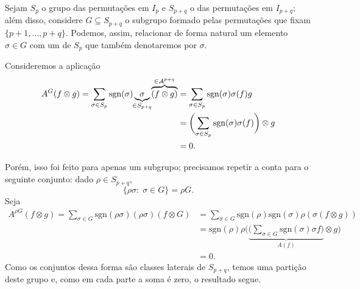 \documentclass[../differential_forms.tex]{subfiles}
\begin{document}
\begin{proof*}
	Sejam \(S_{p}\) o grupo das permutações em \(I_{p}\) e \(S_{p+q}\) o das permutações em \(I_{p+q}\); além disso, considere \(G\subseteq S_{p+q}\) o subgrupo formado
	pelas permutações que fixam \(\{p+1, \dotsc , p+q\}\). Podemos, assim, relacionar de forma natural um elemento \(\sigma \in G\) com um de \(S_{p}\) que também denotaremos
	por \(\sigma\).

	Consideremos a aplicação
	\begin{align*}
		A^{G}(f \otimes g) = \sum\limits_{\sigma \in S_{p}}^{}\mathrm{sgn}(\sigma) \underbrace{\sigma}_{\mathclap{\in S_{p+q}}} \overbrace{(f\otimes g)}^{\in \mathcal{A}^{p+q}} & = \sum\limits_{\sigma \in S_{p}}^{}\mathrm{sgn}(\sigma) \sigma (f)g                       \\
		                                                                                                                                                                         & = \biggl(\sum\limits_{\sigma \in S_{p}}^{}\mathrm{sgn}(\sigma) \sigma (f)\biggr)\otimes g \\
		                                                                                                                                                                         & = 0.
	\end{align*}

	Porém, isso foi feito para apenas um subgrupo; precisamos repetir a conta para o seguinte conjunto: dado \(\rho \in S_{p+q}\),
	\[
		\{\rho \sigma :\; \sigma \in G\} = \rho G.
	\]
	Seja
	\begin{align*}
		A^{\rho G}(f\otimes g) = \sum\limits_{\sigma \in G}^{}\mathrm{sgn}(\rho \sigma )(\rho \sigma )(f\otimes G) & = \sum\limits_{\sigma \in G}^{}\mathrm{sgn}(\rho) \mathrm{sgn}(\sigma )\rho (\sigma (f\otimes g))                                          \\
		                                                                                                           & = \mathrm{sgn}(\rho )\rho \biggl(\underbrace{\bigl(\sum\limits_{\sigma \in G}^{}\mathrm{sgn}(\sigma)\sigma f\bigr)}_{A(f)}\otimes g\biggr) \\
		                                                                                                           & = 0.
	\end{align*}
	Como os conjuntos dessa forma são classes laterais de \(S_{p+q}\), temos uma partição deste grupo e, como em cada parte a soma é zero, o resultado segue. \qedsymbol
\end{proof*}
\end{document}
